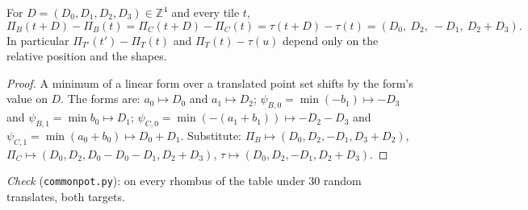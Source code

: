 \documentclass[11pt]{article}
\theoremstyle{definition}\newtheorem{definition}[theorem]{Definition}\newtheorem{remark}[theorem]{Remark}
\newcommand{\Z}{\mathbb Z}
\begin{document}
\begin{lemma}\label{lem:shift}
For $D=(D_0,D_1,D_2,D_3)\in\Z^4$ and every tile $t$,
\[\Pi_B(t+D)-\Pi_B(t)=\Pi_C(t+D)-\Pi_C(t)=\tau(t+D)-\tau(t)=(D_0,\ D_2,\ -D_1,\ D_2+D_3).\]
In particular $\Pi_{T'}(t')-\Pi_T(t)$ and $\Pi_T(t)-\tau(u)$ depend only on the relative position and the shapes.
\end{lemma}
\begin{proof}
A minimum of a linear form over a translated point set shifts by the form's value on $D$. The forms are: $a_0\mapsto D_0$ and $a_1\mapsto D_2$; $\psi_{B,0}=\min(-b_1)\mapsto-D_3$ and $\psi_{B,1}=\min b_0\mapsto D_1$; $\psi_{C,0}=\min(-(a_1+b_1))\mapsto-D_2-D_3$ and $\psi_{C,1}=\min(a_0+b_0)\mapsto D_0+D_1$. Substitute: $\Pi_B\mapsto(D_0,D_2,-D_1,D_3+D_2)$, $\Pi_C\mapsto(D_0,D_2,D_0-D_0-D_1,D_2+D_3)$, $\tau\mapsto(D_0,D_2,-D_1,D_2+D_3)$.
\end{proof}
\noindent\emph{Check} (\texttt{commonpot.py}): on every rhombus of the table under 30 random translates, both targets.
\end{document}
